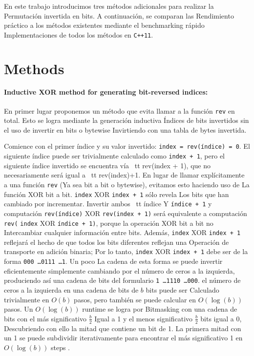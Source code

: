 ﻿\documentclass[10pt]{article}
\begin{document}
En este trabajo introducimos tres métodos adicionales para realizar la
Permutación invertida en bits. A continuación, se comparan las
Rendimiento práctico a los métodos existentes mediante el benchmarking rápido
Implementaciones de todos los métodos en {\tt C++11}.

\section*{Methods}

\paragraph{Inductive XOR method for generating bit-reversed indices:}
En primer lugar proponemos un método que evita llamar a la función {\tt rev}
en total. Esto se logra mediante la generación inductiva
Índices de bits invertidos sin el uso de invertir en bits o bytewise
Invirtiendo con una tabla de bytes invertida.

Comience con el primer índice y su valor invertido: {\tt index = rev(índice) = 0}. El siguiente índice puede ser trivialmente calculado como {\tt index + 1}, pero el siguiente índice invertido se encuentra vía {\ tt rev(index + 1)}, que no necesariamente será igual a {\ tt rev(index)+1}. En lugar de llamar explícitamente a una función {\tt rev}
(Ya sea bit a bit o bytewise), evitamos esto haciendo uso de
La función XOR bit a bit. {\tt index} XOR {\tt index + 1} sólo revela
Los bits que han cambiado por incrementar. Invertir ambos {\ tt índice}
Y {\tt índice + 1} y computación {\tt rev(índice)} XOR {\tt rev(index + 1)} será equivalente a computación {\tt rev(} {\tt index}
XOR {\tt índice + 1)}, porque la operación XOR bit a bit no
Intercambiar cualquier información entre bits. Además, {\tt index} XOR
{\tt index + 1} reflejará el hecho de que todos los bits diferentes reflejan una
Operación de transporte en adición binaria; Por lo tanto, {\tt index} XOR {\tt index + 1} debe ser de la forma {\tt 000 \ldots 0111 \ldots 1}. Un poco
La cadena de esta forma se puede invertir eficientemente simplemente cambiando por el número de ceros a la izquierda, produciendo así una cadena de bits del formulario {\tt 1 \ldots 1110 \ldots 000}. el número de ceros a la izquierda en una cadena de bits de $ b $ bits puede ser
Calculado trivialmente en $O(b)$ pasos, pero también se puede calcular en
$O(\log(b))$ pasos. Un $O(\log(b))$ runtime se logra por
Bitmasking con una cadena de bits con el más significativo $\frac{b}{2}$
Igual a 1 y el menos significativo $\frac{b}{2}$ bits igual a 0,
Descubriendo con ello la mitad que contiene un bit de 1. La primera mitad con un 1 se puede subdividir iterativamente para encontrar el más significativo 1 en $O(\log(b))$ steps \cite{anderson: bit}.
\end{document}
